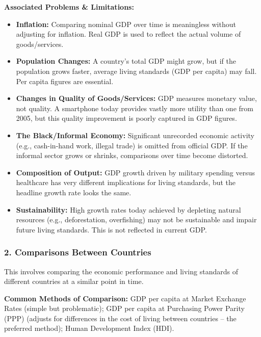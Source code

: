 \documentclass[11pt, a4paper, twoside]{book}
\begin{document}
\textbf{Associated Problems \& Limitations:}
\begin{itemize}
  \item \textbf{Inflation:} Comparing nominal GDP over time is meaningless without adjusting for inflation. Real GDP is used to reflect the actual volume of goods/services.
  \item \textbf{Population Changes:} A country's total GDP might grow, but if the population grows faster, average living standards (GDP per capita) may fall. Per capita figures are essential.
  \item \textbf{Changes in Quality of Goods/Services:} GDP measures monetary value, not quality. A smartphone today provides vastly more utility than one from 2005, but this quality improvement is poorly captured in GDP figures.
  \item \textbf{The Black/Informal Economy:} Significant unrecorded economic activity (e.g., cash-in-hand work, illegal trade) is omitted from official GDP. If the informal sector grows or shrinks, comparisons over time become distorted.
  \item \textbf{Composition of Output:} GDP growth driven by military spending versus healthcare has very different implications for living standards, but the headline growth rate looks the same.
  \item \textbf{Sustainability:} High growth rates today achieved by depleting natural resources (e.g., deforestation, overfishing) may not be sustainable and impair future living standards. This is not reflected in current GDP.
\end{itemize}

\subsubsection{2. Comparisons Between Countries}

This involves comparing the economic performance and living standards of different countries at a similar point in time.

\textbf{Common Methods of Comparison:} GDP per capita at Market Exchange Rates (simple but problematic); GDP per capita at Purchasing Power Parity (PPP) (adjusts for differences in the cost of living between countries -- the preferred method); Human Development Index (HDI).
\end{document}
